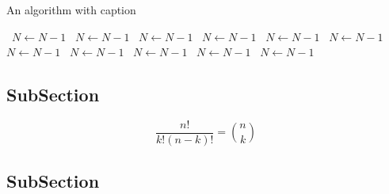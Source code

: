 \documentclass[a4paper]{article}
\begin{document}
\begin{algorithm}
\caption{An algorithm with caption}
\begin{algorithmic}
\    \State $N \gets N - 1$
\    \State $N \gets N - 1$
\    \State $N \gets N - 1$
\    \State $N \gets N - 1$
\    \State $N \gets N - 1$
\    \State $N \gets N - 1$
\    \State $N \gets N - 1$
\    \State $N \gets N - 1$
\    \State $N \gets N - 1$
\    \State $N \gets N - 1$
\    \State $N \gets N - 1$
\EndWhile
\end{algorithmic}
\end{algorithm}

\subsection{SubSection}

\[ \frac{n!}{k!(n-k)!} = \binom{n}{k} \]

\subsection{SubSection}
\end{document}
